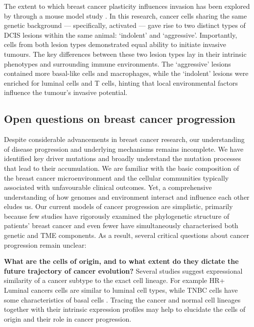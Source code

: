 The extent to which breast cancer plasticity influences invasion has been explored by \textcite{Sinha2021-mf} through a mouse model study . In this research, cancer cells sharing the same genetic background — specifically, activated  — gave rise to two distinct types of \ac{DCIS} lesions within the same animal: `indolent' and `aggressive'. Importantly, cells from both lesion types demonstrated equal ability to initiate invasive tumours. The key differences between these two lesion types lay in their intrinsic phenotypes and surrounding immune environments. The `aggressive' lesions contained more basal-like cells and macrophages, while the `indolent' lesions were enriched for luminal cells and T cells, hinting that local environmental factors influence the tumour's invasive potential.

\subsection{Open questions on breast cancer progression}
\label{sec:application-open-questions}
Despite considerable advancements in breast cancer research, our understanding of disease progression and underlying mechanisms remains incomplete. We have identified key driver mutations and broadly understand the mutation processes that lead to their accumulation. We are familiar with the basic composition of the breast cancer microenvironment and the cellular communities typically associated with unfavourable clinical outcomes. Yet, a comprehensive understanding of how genomes and environment interact and influence each other eludes us. Our current models of cancer progression are simplistic, primarily because few studies have rigorously examined the phylogenetic structure of patients' breast cancer and even fewer have simultaneously characterised both genetic and \ac{TME} components. As a result, several critical questions about cancer progression remain unclear:

\textbf{What are the cells of origin, and to what extent do they dictate the future trajectory of cancer evolution?} Several studies suggest expressional similarity of a cancer subtype to the exact cell lineage. For example HR+ Luminal cancers cells are similar to luminal cell types, while TNBC cells have some characteristics of basal cells \parencite{Skibinski2015-rh, Taurin2020-mq} . Tracing the cancer and normal cell lineages together with their intrinsic expression profiles may help to elucidate the cells of origin and their role in cancer progression.

